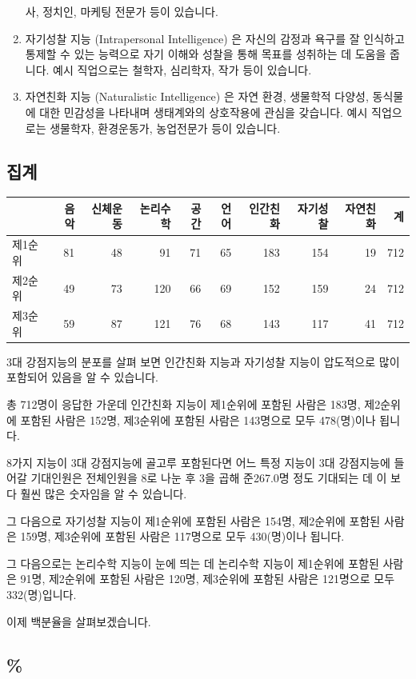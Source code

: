 \documentclass[
]{book}
\begin{document}
\begin{enumerate}
사, 정치인, 마케팅 전문가 등이 있습니다.
\item
  자기성찰 지능 (Intrapersonal Intelligence) 은 자신의 감정과 욕구를 잘 인식하고 통제할 수 있는 능력으로 자기 이해와 성찰을 통해 목표를 성취하는 데 도움을 줍니다. 예시 직업으로는 철학자, 심리학자, 작가 등이 있습니다.
\item
  자연친화 지능 (Naturalistic Intelligence) 은 자연 환경, 생물학적 다양성, 동식물에 대한 민감성을 나타내며 생태계와의 상호작용에 관심을 갖습니다. 예시 직업으로는 생물학자, 환경운동가, 농업전문가 등이 있습니다.
\end{enumerate}

\subsection{집계}\label{uxc9d1uxacc4-55}

\begin{tabular}{l|r|r|r|r|r|r|r|r|r}
\hline
  & 음악 & 신체운동 & 논리수학 & 공간 & 언어 & 인간친화 & 자기성찰 & 자연친화 & 계\\
\hline
제1순위 & 81 & 48 & 91 & 71 & 65 & 183 & 154 & 19 & 712\\
\hline
제2순위 & 49 & 73 & 120 & 66 & 69 & 152 & 159 & 24 & 712\\
\hline
제3순위 & 59 & 87 & 121 & 76 & 68 & 143 & 117 & 41 & 712\\
\hline
\end{tabular}

3대 강점지능의 분포를 살펴 보면 인간친화 지능과 자기성찰 지능이 압도적으로 많이 포함되어 있음을 알 수 있습니다.

총 712명이 응답한 가운데 인간친화 지능이 제1순위에 포함된 사람은 183명, 제2순위에 포함된 사람은 152명, 제3순위에 포함된 사람은 143명으로 모두 478(명)이나 됩니다.

8가지 지능이 3대 강점지능에 골고루 포함된다면 어느 특정 지능이 3대 강점지능에 들어갈 기대인원은 전체인원을 8로 나눈 후 3을 곱해 준267.0명 정도 기대되는 데 이 보다 훨씬 많은 숫자임을 알 수 있습니다.

그 다음으로
자기성찰 지능이 제1순위에 포함된 사람은 154명, 제2순위에 포함된 사람은 159명, 제3순위에 포함된 사람은 117명으로 모두 430(명)이나 됩니다.

그 다음으로는 논리수학 지능이 눈에 띄는 데 논리수학 지능이 제1순위에 포함된 사람은 91명, 제2순위에 포함된 사람은 120명, 제3순위에 포함된 사람은 121명으로 모두 332(명)입니다.

이제 백분율을 살펴보겠습니다.

\subsection{\%}\label{section-28}
\end{document}
